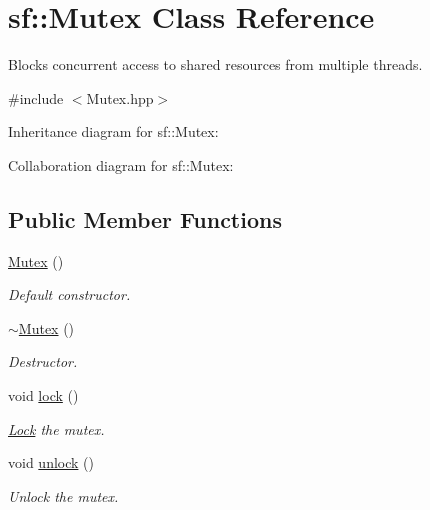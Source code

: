 \hypertarget{classsf_1_1_mutex}{}\section{sf\+:\+:Mutex Class Reference}
\label{classsf_1_1_mutex}


Blocks concurrent access to shared resources from multiple threads.  




{\ttfamily \#include $<$Mutex.\+hpp$>$}



Inheritance diagram for sf\+:\+:Mutex\+:


Collaboration diagram for sf\+:\+:Mutex\+:
\subsection*{Public Member Functions}
\begin{DoxyCompactItemize}
\item 
\mbox{\label{classsf_1_1_mutex_a9bd52a48320fd7b6db8a78037aad276e}} 
\hyperlink{classsf_1_1_mutex_a9bd52a48320fd7b6db8a78037aad276e}{Mutex} ()
\begin{DoxyCompactList}\small\item\em Default constructor. \end{DoxyCompactList}\item 
\mbox{\label{classsf_1_1_mutex_a9f76a67b7b6d3918131a692179b4e3f2}} 
\hyperlink{classsf_1_1_mutex_a9f76a67b7b6d3918131a692179b4e3f2}{$\sim$\+Mutex} ()
\begin{DoxyCompactList}\small\item\em Destructor. \end{DoxyCompactList}\item 
void \hyperlink{classsf_1_1_mutex_a1a16956a6bbea764480c1b80f2e45763}{lock} ()
\begin{DoxyCompactList}\small\item\em \hyperlink{classsf_1_1_lock}{Lock} the mutex. \end{DoxyCompactList}\item 
void \hyperlink{classsf_1_1_mutex_ade71268ffc5e80756652058b01c23c33}{unlock} ()
\begin{DoxyCompactList}\small\item\em Unlock the mutex. \end{DoxyCompactList}\end{DoxyCompactItemize}


